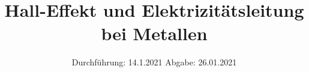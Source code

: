 

\subject{Versuch Nr.V703}
\title{Hall-Effekt und Elektrizitätsleitung bei Metallen}
\date{%
  Durchführung: 14.1.2021
  \hspace{3em}
  Abgabe: 26.01.2021
}



\maketitle
\thispagestyle{empty}
\tableofcontents
\newpage 


%
%

%
%

\nocite{*}

\printbibliography{}


